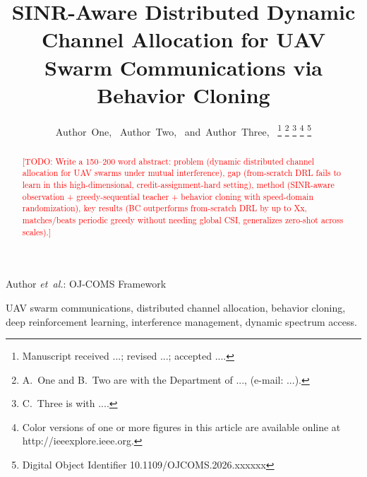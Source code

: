 \documentclass[journal]{IEEEtran}
\newcommand{\todo}[1]{\textcolor{red}{[TODO: #1]}}
\begin{document}
\title{SINR-Aware Distributed Dynamic Channel Allocation for UAV Swarm
Communications via Behavior Cloning}

\author{
  Author~One,~
  Author~Two,~
  and~Author~Three,~%
  \thanks{Manuscript received ...; revised ...; accepted ....}
  \thanks{A.~One and B.~Two are with the Department of ...,
    (e-mail: ...).}
  \thanks{C.~Three is with ....}
  \thanks{Color versions of one or more figures in this article are available
    online at http://ieeexplore.ieee.org.}
  \thanks{Digital Object Identifier 10.1109/OJCOMS.2026.xxxxxx}
}

%
{Author \MakeLowercase{\textit{et~al.}}: OJ-COMS Framework}

\maketitle

\begin{abstract}
\todo{Write a 150--200 word abstract: problem (dynamic distributed channel
allocation for UAV swarms under mutual interference), gap (from-scratch DRL
fails to learn in this high-dimensional, credit-assignment-hard setting),
method (SINR-aware observation + greedy-sequential teacher + behavior cloning
with speed-domain randomization), key results (BC outperforms from-scratch DRL
by up to Xx, matches/beats periodic greedy without needing global CSI,
generalizes zero-shot across scales).}
\end{abstract}

\begin{IEEEkeywords}
UAV swarm communications, distributed channel allocation, behavior cloning,
deep reinforcement learning, interference management, dynamic spectrum access.
\end{IEEEkeywords}
\end{document}
